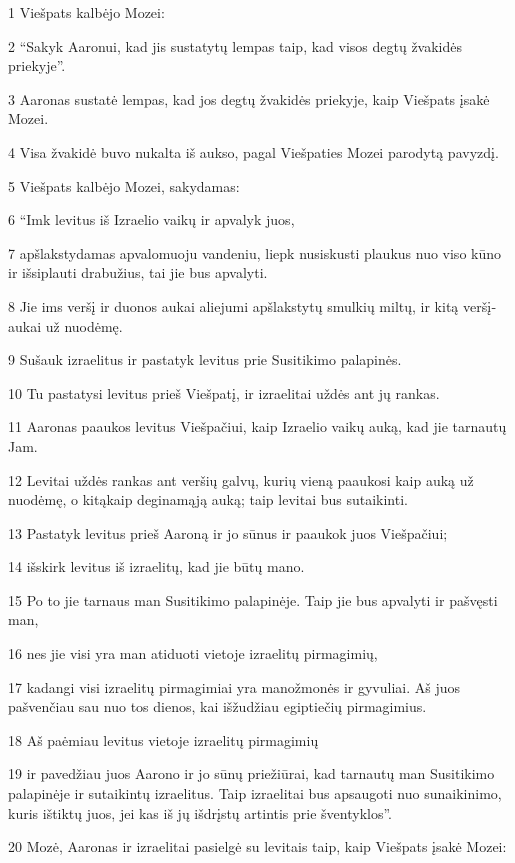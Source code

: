 \par 1 Viešpats kalbėjo Mozei: 
\par 2 “Sakyk Aaronui, kad jis sustatytų lempas taip, kad visos degtų žvakidės priekyje”. 
\par 3 Aaronas sustatė lempas, kad jos degtų žvakidės priekyje, kaip Viešpats įsakė Mozei. 
\par 4 Visa žvakidė buvo nukalta iš aukso, pagal Viešpaties Mozei parodytą pavyzdį. 
\par 5 Viešpats kalbėjo Mozei, sakydamas: 
\par 6 “Imk levitus iš Izraelio vaikų ir apvalyk juos, 
\par 7 apšlakstydamas apvalomuoju vandeniu, liepk nusiskusti plaukus nuo viso kūno ir išsiplauti drabužius, tai jie bus apvalyti. 
\par 8 Jie ims veršį ir duonos aukai­ aliejumi apšlakstytų smulkių miltų, ir kitą veršį­aukai už nuodėmę. 
\par 9 Sušauk izraelitus ir pastatyk levitus prie Susitikimo palapinės. 
\par 10 Tu pastatysi levitus prieš Viešpatį, ir izraelitai uždės ant jų rankas. 
\par 11 Aaronas paaukos levitus Viešpačiui, kaip Izraelio vaikų auką, kad jie tarnautų Jam. 
\par 12 Levitai uždės rankas ant veršių galvų, kurių vieną paaukosi kaip auką už nuodėmę, o kitą­kaip deginamąją auką; taip levitai bus sutaikinti. 
\par 13 Pastatyk levitus prieš Aaroną ir jo sūnus ir paaukok juos Viešpačiui; 
\par 14 išskirk levitus iš izraelitų, kad jie būtų mano. 
\par 15 Po to jie tarnaus man Susitikimo palapinėje. Taip jie bus apvalyti ir pašvęsti man, 
\par 16 nes jie visi yra man atiduoti vietoje izraelitų pirmagimių, 
\par 17 kadangi visi izraelitų pirmagimiai yra mano­žmonės ir gyvuliai. Aš juos pašvenčiau sau nuo tos dienos, kai išžudžiau egiptiečių pirmagimius. 
\par 18 Aš paėmiau levitus vietoje izraelitų pirmagimių 
\par 19 ir pavedžiau juos Aarono ir jo sūnų priežiūrai, kad tarnautų man Susitikimo palapinėje ir sutaikintų izraelitus. Taip izraelitai bus apsaugoti nuo sunaikinimo, kuris ištiktų juos, jei kas iš jų išdrįstų artintis prie šventyklos”. 
\par 20 Mozė, Aaronas ir izraelitai pasielgė su levitais taip, kaip Viešpats įsakė Mozei: 
